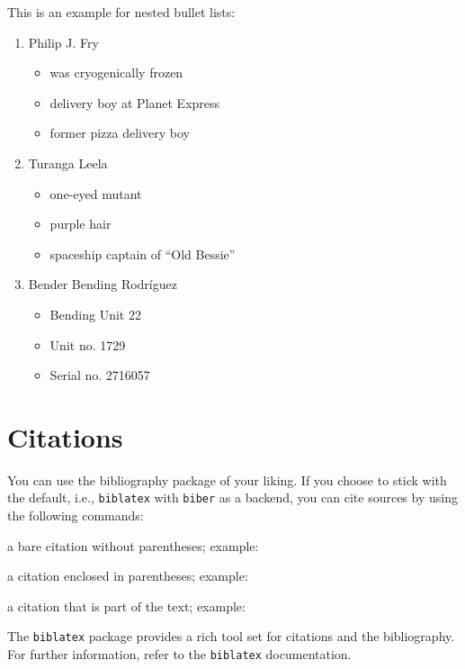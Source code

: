 This is an example for nested bullet lists: 
\begin{enumerate} 
	\item Philip J. Fry 
	\begin{itemize} 
		\item was cryogenically frozen 
		\item delivery boy at Planet Express
		\item former pizza delivery boy
	\end{itemize}
	\item Turanga Leela 
	\begin{itemize}
		\item one-eyed mutant
		\item purple hair 
		\item spaceship captain of \enquote{Old Bessie} 
	\end{itemize}
	\item Bender Bending Rodr\'{i}guez
	\begin{itemize}
		\item Bending Unit 22
		\item Unit no. 1729
		\item Serial no. 2716057
	\end{itemize}
\end{enumerate}

\section{Citations}
 
You can use the bibliography package of your liking. If you choose to stick with the default, i.e., \texttt{biblatex} with \texttt{biber} as a backend, you can cite sources by using the following commands: 
\begin{description}[font=\normalfont\ttfamily]
	\item[\textbackslash{}cite] a bare citation without parentheses; example: \cite{adams1979} 
	\item[\textbackslash{}parencite] a citation enclosed in parentheses; example: \parencite{adams1979} 
	\item[\textbackslash{}textcite] a citation that is part of the text; example: \textcite{adams1979} 
\end{description}
The \texttt{biblatex} package provides a rich tool set for citations and the bibliography. For further information, refer to the \texttt{biblatex} documentation. %